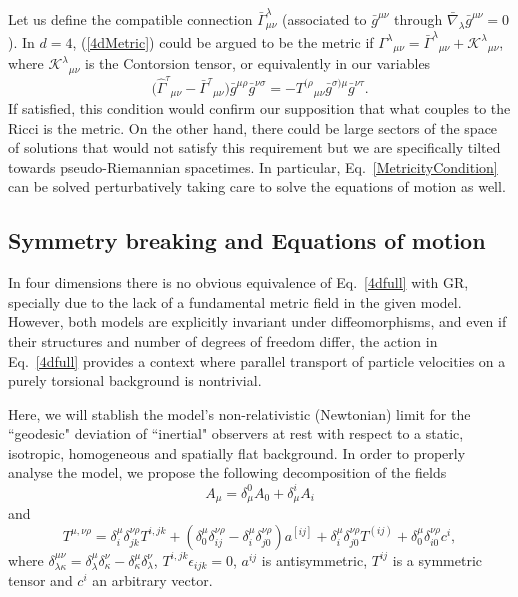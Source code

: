 \documentclass[twocolumn,
  showpacs,showkeys,prd,superscriptaddress]{revtex4-1}
\begin{document}
Let us define the compatible connection $\bar{\Gamma}^{\lambda}_{\mu\nu}$ (associated to $\bar g^{\mu\nu}$ through $\bar{\nabla}_\lambda \bar{ g}^{\mu\nu}=0$). In $d=4$, (\ref{4dMetric}) could be argued to be the metric if  $\Gamma^\lambda{}_{\mu\nu}=\bar\Gamma^\lambda{}_{\mu\nu}
+{\mathcal K}^\lambda{}_{\mu\nu}$, where ${\mathcal K}^\lambda{}_{\mu\nu}$ is the Contorsion tensor, or equivalently in our variables
\begin{dmath}\label{MetricityCondition}
\Big(\hat\Gamma^{\tau}{}_{\mu\nu}-\bar\Gamma^{\tau}{}_{\mu\nu}\Big)\bar g^{\mu\rho}\bar g^{\nu\sigma}=
-T^{(\rho}{}_{\mu\nu}\bar g^{\sigma)\mu}\bar g^{\nu\tau}	.
\end{dmath} 
If satisfied, this condition would confirm our supposition that what couples to the Ricci is the metric. On the other hand, there could be large sectors of the space of solutions that would not satisfy this requirement but we are specifically tilted towards pseudo-Riemannian spacetimes. In particular, Eq.~\eqref{MetricityCondition} can be solved perturbatively taking care to solve the equations of motion as well.



\subsection*{Symmetry breaking and Equations of motion }

In four dimensions there is no obvious equivalence of Eq.~\eqref{4dfull} with GR, specially due to the lack of a fundamental metric field in the given model. However, both models are explicitly invariant under diffeomorphisms, and even if their structures and number of degrees of freedom differ, the action in Eq.~\eqref{4dfull} provides a context where parallel transport of particle velocities on a purely torsional background is nontrivial.

Here, we will stablish the model's non-relativistic (Newtonian) limit for the ``geodesic" deviation of ``inertial" observers at rest with respect to a static, isotropic, homogeneous and spatially flat background. In order to properly analyse the model, we  propose the following decomposition of the fields
\begin{dmath}
  A_\mu = \delta_\mu^0 A_0 + \delta_\mu^i A_i 
\end{dmath}
and
\begin{dmath}
  T^{\mu,\nu\rho} = \delta^{\mu}_i\delta^{\nu\rho}_{jk}T^{i,jk} + (\delta^{\mu}_0\delta^{\nu\rho}_{ij}-\delta^{\mu}_i\delta^{\nu\rho}_{j0})a^{[ij]} + \delta^{\mu}_i\delta^{\nu\rho}_{j0}T^{(ij)} + \delta^{\mu}_0\delta^{\nu\rho}_{i0}c^i,
\end{dmath}
where $\delta^{\mu\nu}_{\lambda\kappa}=\delta^{\mu}_{\lambda}\delta^{\nu}_{\kappa}-\delta^{\mu}_{\kappa}\delta^{\nu}_{\lambda}$, $T^{i,jk}\epsilon_{ijk}=0$, $a^{ij}$ is antisymmetric, $T^{ij}$ is a symmetric tensor and $c^i$ an arbitrary vector.
\end{document}
